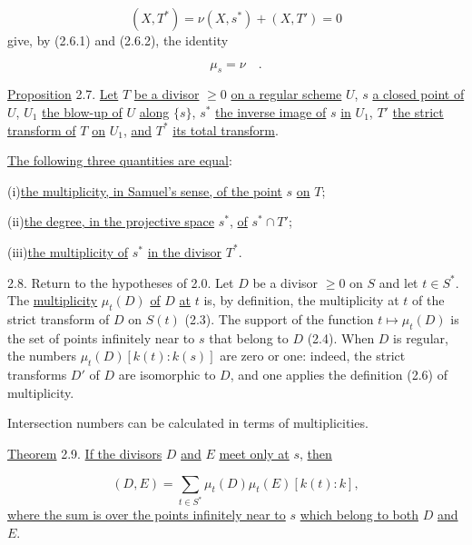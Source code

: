 \begin{equation*}
(X,T^*)=\nu(X,s^*)+(X,T')=0
\end{equation*}
give, by (2.6.1) and (2.6.2), the identity

\begin{equation}\tag{2.6.3}
\mu_s=\nu \quad .
\end{equation}


\underline{Proposition} 2.7. \underline{Let} $T$ \underline{be a divisor}
$\geq0$ \underline{on a regular scheme} $U$, $s$ \underline{a closed point of}
$U$, $U_1$ \underline{the blow-up of} $U$ \underline{along} $\{s\}$, $s^*$
\underline{the inverse image of} $s$ \underline{in} $U_1$, $T'$ \underline{the
strict transform of} $T$ \underline{on} $U_1$, \underline{and} $T^*$
\underline{its total transform}.

\underline{The following three quantities are equal}:

(i)\quad \underline{the multiplicity, in Samuel's sense, of the point} $s$
\underline{on} $T$;

(ii)\quad \underline{the degree, in the projective space} $s^*$,
\underline{of} $s^*\cap T'$;

(iii)\quad \underline{the multiplicity of} $s^*$ \underline{in the divisor}
$T^*$.

2.8. Return to the hypotheses of 2.0.  Let $D$ be a divisor $\geq0$ on $S$ and
let $t\in S^*$.  The \underline{multiplicity} $\mu_t(D)$ \underline{of} $D$
\underline{at} $t$ is, by definition, the multiplicity at $t$ of the strict
transform of $D$ on $S(t)$ (2.3).  The support of the function
$t\mapsto\mu_t(D)$ is the set of points infinitely near to $s$ that belong to
$D$ (2.4).  When $D$ is regular, the numbers
$\mu_t(D)[k(t):k(s)]$ are zero or one: indeed, the strict transforms $D'$ of $D$
are isomorphic to $D$, and one applies the definition (2.6) of multiplicity.

Intersection numbers can be calculated in terms of multiplicities.

\underline{Theorem} 2.9. \underline{If the divisors} $D$ \underline{and} $E$
\underline{meet only at} $s$, \underline{then}

\begin{equation*}
(D,E)=\sum_{t\in S^*}\mu_t(D)\mu_t(E)[k(t):k],
\end{equation*}
\underline{where the sum is over the points infinitely near to} $s$
\underline{which belong to both} $D$ \underline{and} $E$.
